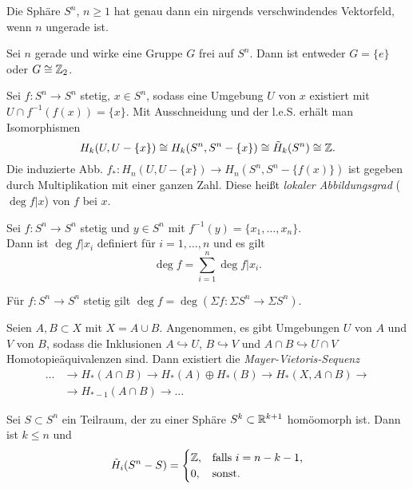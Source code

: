 \documentclass{cheat-sheet}
\newcommand{\RH}{\tilde{H}} %
\begin{document}
\begin{satz}
  Die Sphäre $S^n$, $n \geq 1$ hat genau dann ein nirgends verschwindendes Vektorfeld, wenn $n$ ungerade ist.
\end{satz}

\begin{satz}
  Sei $n$ gerade und wirke eine Gruppe $G$ frei auf $S^n$. Dann ist entweder $G = \{ e \}$ oder $G \cong \mathbb{Z}_2$.
\end{satz}


\begin{defn}
  Sei $f : S^n \to S^n$ stetig, $x \in S^n$, sodass eine Umgebung $U$ von $x$ existiert mit $U \cap f^{-1}(f(x)) = \{ x \}$. Mit Ausschneidung und der l.e.S. erhält man Isomorphismen
  \[ H_k(U, U - \{ x \}) \cong H_k(S^n, S^n - \{ x \}) \cong \RH_k(S^n) \cong \Z. \]
  Die induzierte Abb. $f_* : H_n(U, U - \{ x \}) \to H_n(S^n, S^n - \{ f(x) \})$ ist gegeben durch Multiplikation mit einer ganzen Zahl. Diese heißt \emph{lokaler Abbildungsgrad} ($\deg f|x$) von $f$ bei $x$.
\end{defn}

\begin{prop}
  Sei $f : S^n \to S^n$ stetig und $y {\in} S^n$ mit $f^{-1}(y) = \{ x_1, \ldots, x_n \}$.\\
  Dann ist $\deg f|x_i$ definiert für $i = 1, \ldots, n$ und es gilt
  \[ \deg f = \sum_{i=1}^n \deg f|x_i. \]
\end{prop}

\begin{prop}
  Für $f : S^n \to S^n$ stetig gilt 
  $\deg f = \deg (\Sigma f : \Sigma S^n \to \Sigma S^n)$.
\end{prop}

\begin{prop}
  Seien $A, B \subset X$ mit $X = A \cup B$. Angenommen, es gibt Umgebungen $U$ von $A$ und $V$ von $B$, sodass die Inklusionen $A \hookrightarrow U$, $B \hookrightarrow V$ und $A \cap B \hookrightarrow U \cap V$ Homotopieäquivalenzen sind. Dann existiert die \emph{Mayer-Vietoris-Sequenz}
  \begin{align*}
    \ldots & \to H_*(A \cap B) \to H_*(A) \oplus H_*(B) \to H_*(X, A \cap B) \to \\
    & \to H_{*-1}(A \cap B) \to \ldots
  \end{align*}
\end{prop}

\begin{prop}
  Sei $S \subset S^n$ ein Teilraum, der zu einer Sphäre $S^k \subset \mathbb{R}^{k+1}$ homöomorph ist. Dann ist $k \leq n$ und
  \[ \RH_i(S^n - S) = \begin{cases}
    \Z, & \text{falls $i = n - k - 1$,} \\
    0, & \text{sonst.}
  \end{cases} \]
\end{prop}
\end{document}
